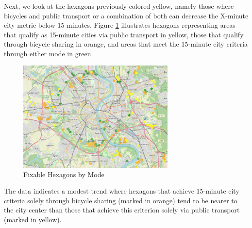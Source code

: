 Next, we look at the hexagons previously colored yellow, namely those where bicycles and public transport or a combination of both can decrease the X-minute city metric below 15 minutes.
Figure \ref{fig:fixable_hexagons} illustrates hexagons representing areas that qualify as 15-minute cities via public transport in yellow, those that qualify through bicycle sharing in orange, and areas that meet the 15-minute city criteria through either mode in green.
\begin{figure}
  \begin{center}
    \includegraphics[width=0.70\textwidth]{Figures/results/problematic_hexagons/fixable_hexagons}
  \end{center}
  \caption{Fixable Hexagons by Mode}
  \label{fig:fixable_hexagons}
\end{figure}
The data indicates a modest trend where hexagons that achieve 15-minute city criteria solely through bicycle sharing (marked in orange) tend to be nearer to the city center than those that achieve this criterion solely via public transport (marked in yellow).

